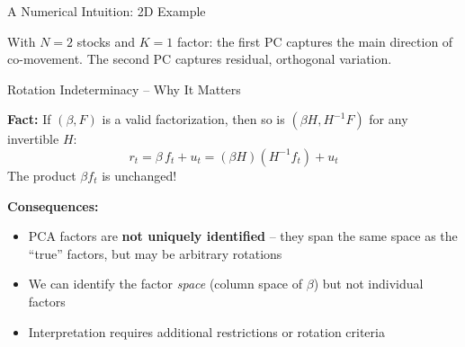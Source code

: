 \documentclass[aspectratio=169]{beamer}
\begin{document}
%
%
\begin{frame}{A Numerical Intuition: 2D Example}

\begin{center}
\end{center}
\footnotesize
With $N = 2$ stocks and $K = 1$ factor: the first PC captures the main direction of co-movement. The second PC captures residual, orthogonal variation.
\end{frame}
%
%
\begin{frame}{Rotation Indeterminacy -- Why It Matters}

\textbf{Fact:} If $(\beta, F)$ is a valid factorization, then so is $(\beta H, H^{-1} F)$ for any invertible $H$:
\[
r_t = \beta\, f_t + u_t = (\beta H)(H^{-1}f_t) + u_t
\]
The product $\beta f_t$ is unchanged!

\vspace{0.7em}
\textbf{Consequences:}
\begin{itemize}
    \item PCA factors are \textbf{not uniquely identified} -- they span the same space as the ``true'' factors, but may be arbitrary rotations
    \item We can identify the factor \emph{space} (column space of $\beta$) but not individual factors
    \item Interpretation requires additional restrictions or rotation criteria
\end{itemize}

\end{frame}
%
\end{document}
